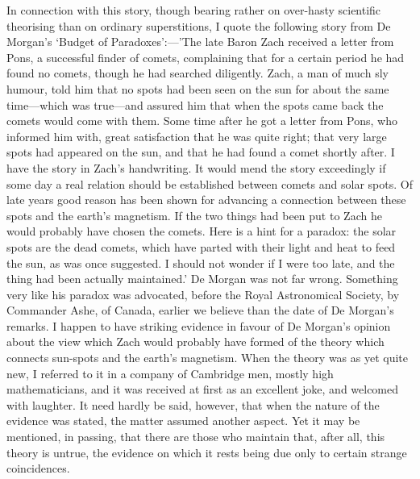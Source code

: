 \documentclass[letterpaper,12pt,oneside,openany]{memoir}
\begin{document}
In connection with this story, though bearing rather
on over-hasty scientific theorising than on ordinary
superstitions, I quote the following story from De
Morgan's `Budget of Paradoxes':---'The late Baron Zach
received a letter from Pons, a successful finder of comets,
complaining that for a certain period he had found no
comets, though he had searched diligently. Zach, a
man of much sly humour, told him that no spots had
been seen on the sun for about the same time---which
was true---and assured him that when the spots came
back the comets would come with them. Some
time after he got a letter from Pons, who informed him
with, great satisfaction that he was quite right; that
very large spots had appeared on the sun, and that he
had found a comet shortly after. I have the story in
Zach's handwriting. It would mend the story exceedingly
if some day a real relation should be established
between comets and solar spots. Of late years
good reason has been shown for advancing a connection
between these spots and the earth's magnetism. If the
two things had been put to Zach he would probably
have chosen the comets. Here is a hint for a paradox:
the solar spots are the dead comets, which have parted
with their light and heat to feed the sun, as was once
suggested. I should not wonder if I were too late,
and the thing had been actually maintained.' De
Morgan was not far wrong. Something very like his
paradox was advocated, before the Royal Astronomical
Society, by Commander Ashe, of Canada, earlier we
believe than the date of De Morgan's remarks. I
happen to have striking evidence in favour of De
Morgan's opinion about the view which Zach would
probably have formed of the theory which connects
sun-spots and the earth's magnetism. When the
theory was as yet quite new, I referred to it in a
company of Cambridge men, mostly high mathematicians,
and it was received at first as an excellent
joke, and welcomed with laughter. It need hardly
be said, however, that when the nature of the evidence
was stated, the matter assumed another aspect.
Yet it may be mentioned, in passing, that there are
those who maintain that, after all, this theory is untrue,
the evidence on which it rests being due only to certain
strange coincidences.
\end{document}
